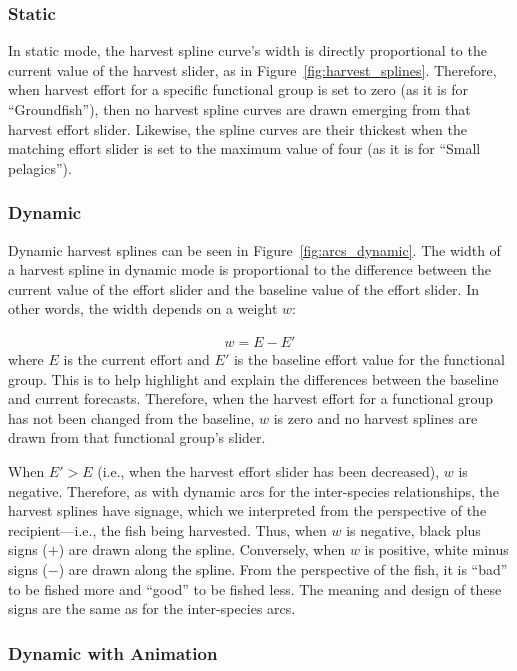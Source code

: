 \subsubsection{Static}

In static mode, the harvest spline curve's width is directly proportional to the current value of the harvest slider, as in Figure~\ref{fig:harvest_splines}.  Therefore, when harvest effort for a specific functional group is set to zero (as it is for ``Groundfish''), then no harvest spline curves are drawn emerging from that harvest effort slider.  Likewise, the spline curves are their thickest when the matching effort slider is set to the maximum value of four (as it is for ``Small pelagics'').

\subsubsection{Dynamic}

Dynamic harvest splines can be seen in Figure~\ref{fig:arcs_dynamic}.  The width of a harvest spline in dynamic mode is proportional to the difference between the current value of the effort slider and the baseline value of the effort slider.  In other words, the width depends on a weight $w$:

\begin{align}
w = E - E'
\end{align}
where $E$ is the current effort and $E'$ is the baseline effort value for the functional group.  This is to help highlight and explain the differences between the baseline and current forecasts.   Therefore, when the harvest effort for a functional group has not been changed from the baseline, $w$ is zero and no harvest splines are drawn from that functional group's slider.

When $E' > E$ (i.e., when the harvest effort slider has been decreased), $w$ is negative.  Therefore, as with dynamic arcs for the inter-species relationships, the harvest splines have signage, which we interpreted from the perspective of the recipient---i.e., the fish being harvested.  Thus, when $w$ is negative, black plus signs ($+$) are drawn along the spline.  Conversely, when $w$ is positive, white minus signs ($-$) are drawn along the spline.  From the perspective of the fish, it is ``bad'' to be fished more and ``good'' to be fished less.  The meaning and design of these signs are the same as for the inter-species arcs.

\subsubsection{Dynamic with Animation}

